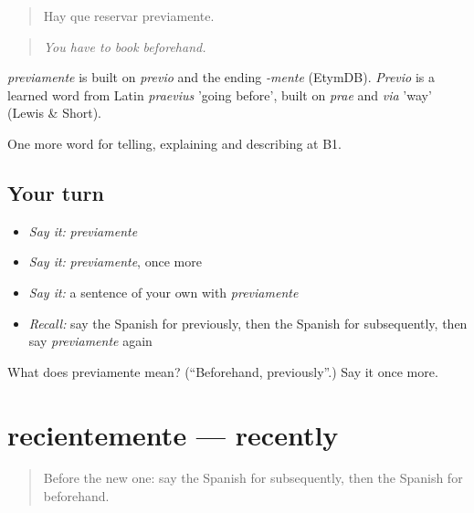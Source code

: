 \begin{quote}
Hay que reservar previamente.
\end{quote}

\begin{quote}
\emph{You have to book beforehand.}
\end{quote}

\begin{cousinweb}
\emph{previamente} is built on \emph{previo} and the ending \emph{-mente} (EtymDB). \emph{Previo} is a learned word from Latin \emph{praevius} 'going before', built on \emph{prae} and \emph{via} 'way' (Lewis \& Short).
\end{cousinweb}

\begin{grammarlens}[title={What you've built}]
One more word for telling, explaining and describing at B1.
\end{grammarlens}

\subsection*{Your turn}
\begin{itemize}
\raggedright
  \item \emph{Say it:} \emph{previamente}
  \item \emph{Say it:} \emph{previamente}, once more
  \item \emph{Say it:} a sentence of your own with \emph{previamente}
  \item \emph{Recall:} say the Spanish for previously, then the Spanish for subsequently, then say \emph{previamente} again
\end{itemize}

\begin{tcolorbox}[breakable,colback=teal!4,colframe=teal!35!black,title={Before you move on}]
What does previamente mean? (\textquotedblleft{}Beforehand, previously\textquotedblright{}.) Say it once more.
\end{tcolorbox}
\section[recientemente]{recientemente — recently}

\label{lesson:ES-C538-recientemente}



\begin{quote}
Before the new one: say the Spanish for subsequently, then the Spanish for beforehand.
\end{quote}

